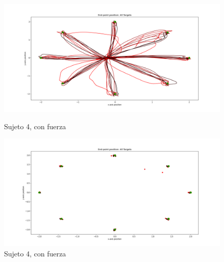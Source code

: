 \documentclass[a4paper,11pt, oneside]{book}
\begin{document}
\begin{figure}[H]
	\begin{minipage}[b]{0.5\linewidth}
		\centering
		\includegraphics[width=\linewidth]{sujeto4/force/trayectorias}
		\caption{Sujeto 4, con fuerza}
		\label{4-fase2-1}
	\end{minipage}
	\hspace{0.5cm}
	\begin{minipage}[b]{0.5\linewidth}
		\centering
		\includegraphics[width=\linewidth]{sujeto4/force/trayectorias_puntos}
		\caption{Sujeto 4, con fuerza}
		\label{4-fase2-2}
	\end{minipage}
\end{figure}
\end{document}
